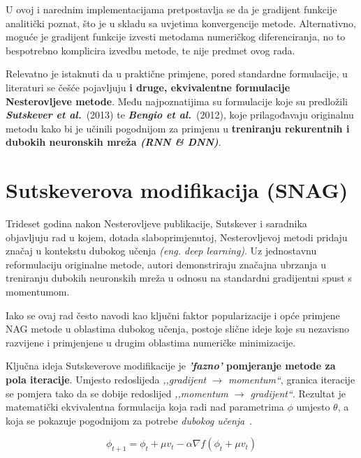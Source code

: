 U ovoj i narednim implementacijama pretpostavlja se da je gradijent funkcije analitički
poznat, što je u skladu sa uvjetima konvergencije metode. Alternativno, moguće je gradijent funkcije izvesti metodama numeričkog diferenciranja, no to bespotrebno komplicira izvedbu
metode, te nije predmet ovog rada.


Relevatno je istaknuti da u praktične primjene, pored standardne formulacije, u literaturi se češće pojavljuju \textbf{i druge, ekvivalentne formulacije Nesterovljeve metode}. Među najpoznatijima su formulacije koje su predložili \textbf{\textit{Sutskever et al.}}~(2013) te \textbf{\textit{Bengio et al.}}~(2012), koje
prilagođavaju originalnu metodu kako bi je učinili pogodnijom za primjenu u \textbf{treniranju
    rekurentnih i dubokih neuronskih mreža \textit{(RNN \& DNN)}}.

\section{Sutskeverova modifikacija (SNAG)}
\label{sec:sutskever}

Trideset godina nakon Nesterovljeve publikacije, Sutskever i saradnika~\cite{sutskever2013}
objavljuju rad u kojem, dotada slaboprimjenutoj, Nesterovljevoj metodi pridaju značaj u kontekstu dubokog učenja \textit{(eng. deep learning)}.
Uz jednostavnu reformulaciju originalne metode, autori demonstriraju značajna ubrzanja u
treniranju dubokih neuronskih mreža u odnosu na standardni gradijentni spust s momentumom.

Iako se ovaj rad često navodi kao ključni faktor popularizacije i opće primjene NAG metode u oblastima dubokog učenja,
postoje slične ideje koje su nezavisno razvijene i primjenjene u drugim oblastima numeričke minimizacije.

Ključna ideja Sutskeverove modifikacije je \textbf{\textit{'fazno'} pomjeranje metode za pola iteracije}.
Umjesto redoslijeda \textit{,,gradijent $\to$ momentum``}, granica iteracije se pomjera tako da se
dobije redoslijed \textit{,,momentum $\to$ gradijent``}. Rezultat je matematički ekvivalentna
formulacija koja radi nad parametrima $\phi$ umjesto $\theta$, a koja se pokazuje pogodnijom za
potrebe \textit{dubokog učenja}~\cite{sutskever2013}.

\begin{equation}
    \phi_{t+1} = \phi_t + \mu v_t - \alpha \nabla f(\phi_t + \mu v_t)
\end{equation}

